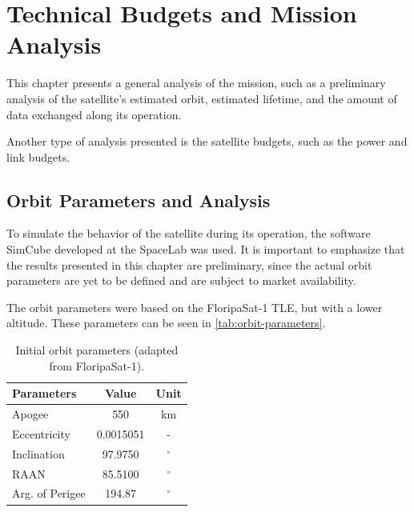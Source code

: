 %
%
%
%
%

%
%
%
%
%
%

\chapter{Technical Budgets and Mission Analysis} \label{ch:budgets}

This chapter presents a general analysis of the mission, such as a preliminary analysis of the satellite's estimated orbit, estimated lifetime, and the amount of data exchanged along its operation.

Another type of analysis presented is the satellite budgets, such as the power and link budgets.

\section{Orbit Parameters and Analysis}

To simulate the behavior of the satellite during its operation, the software SimCube developed at the SpaceLab was used. It is important to emphasize that the results presented in this chapter are preliminary, since the actual orbit parameters are yet to be defined and are subject to market availability.

The orbit parameters were based on the FloripaSat-1 TLE, but with a lower altitude. These parameters can be seen in \autoref{tab:orbit-parameters}.

\begin{table}[!h]
    \centering
    \begin{tabular}{lcc}
        \toprule[1.5pt]
        \textbf{Parameters} & \textbf{Value} & \textbf{Unit} \\
        \midrule
        Apogee                & 550           & km \\
        Eccentricity            & 0.0015051     & - \\
        Inclination             & 97.9750       & $^{\circ}$ \\
        RAAN                    & 85.5100       & $^{\circ}$ \\
        Arg. of Perigee         & 194.87        & $^{\circ}$ \\
        \bottomrule[1.5pt]
    \end{tabular}
    \caption{Initial orbit parameters (adapted from FloripaSat-1).}
    \label{tab:orbit-parameters}
\end{table}

